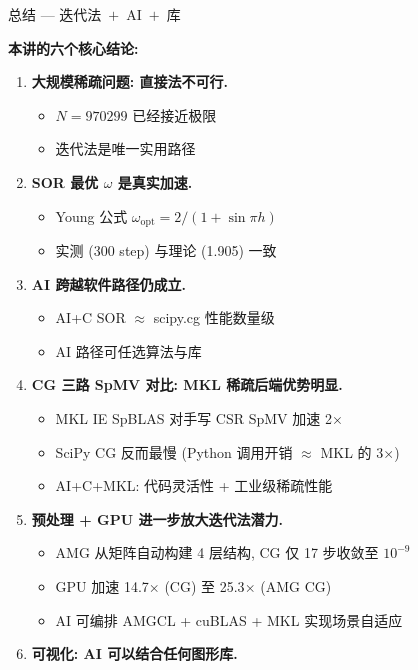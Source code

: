 \documentclass[12pt,aspectratio=169]{beamer}
\begin{document}
\begin{frame}[shrink]{总结 — 迭代法 \,$+$\, AI \,$+$\, 库}

\textbf{本讲的六个核心结论:}
\begin{enumerate}\itemsep2pt
  \item \textbf{大规模稀疏问题: 直接法不可行.}
  \begin{itemize}\itemsep0pt\footnotesize
    \item $N = 970299$ 已经接近极限
    \item 迭代法是唯一实用路径
  \end{itemize}

  \item \textbf{SOR 最优 $\omega$ 是真实加速.}
  \begin{itemize}\itemsep0pt\footnotesize
    \item Young 公式 $\omega_{\text{opt}} = 2/(1+\sin\pi h)$
    \item 实测 (300 step) 与理论 (1.905) 一致
  \end{itemize}

  \item \textbf{AI 跨越软件路径仍成立.}
  \begin{itemize}\itemsep0pt\footnotesize
    \item AI+C SOR $\approx$ scipy.cg 性能数量级
    \item AI 路径可任选算法与库
  \end{itemize}

  \item \textbf{CG 三路 SpMV 对比: MKL 稀疏后端优势明显.}
  \begin{itemize}\itemsep0pt\footnotesize
    \item MKL IE SpBLAS 对手写 CSR SpMV 加速 2$\times$
    \item SciPy CG 反而最慢 (Python 调用开销 $\approx$ MKL 的 3$\times$)
    \item AI+C+MKL: 代码灵活性 + 工业级稀疏性能
  \end{itemize}

  \item \textbf{预处理 + GPU 进一步放大迭代法潜力.}
  \begin{itemize}\itemsep0pt\footnotesize
    \item AMG 从矩阵自动构建 4 层结构, CG 仅 17 步收敛至 $10^{-9}$
    \item GPU 加速 14.7$\times$ (CG) 至 25.3$\times$ (AMG CG)
    \item AI 可编排 AMGCL + cuBLAS + MKL 实现场景自适应
  \end{itemize}

  \item \textbf{可视化: AI 可以结合任何图形库.}
\end{enumerate}

\end{frame}
\end{document}
